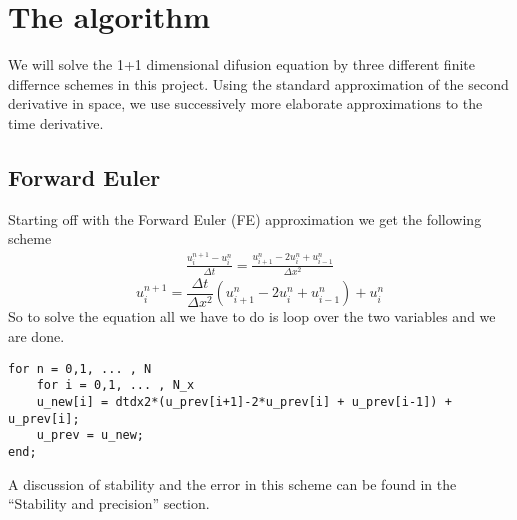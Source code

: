 \documentclass[a4paper,english, 10pt, twoside]{article}
\begin{document}
\section{The algorithm}\label{numerical}
We will solve the 1+1 dimensional difusion equation by three different finite differnce schemes in this project. Using the 
standard approximation of the second derivative in space, we use successively more elaborate approximations to the time derivative. 
\subsection{Forward Euler}
Starting off with the Forward Euler (FE) approximation we get the following scheme
\begin{align*}
 \frac{u^{n+1}_i-u^n_i}{\Delta t} = \frac{u^n_{i+1}-2u^n_i + u^n_{i-1}}{\Delta x^2}
\end{align*}
\begin{equation}\label{FE}
 u^{n+1}_i = \frac{\Delta t}{\Delta x^2}\left(u^n_{i+1}-2u^n_i + u^n_{i-1}\right) +u^n_i
\end{equation}
So to solve the equation all we have to do is loop over the two variables and we are done.\\
\begin{lstlisting}
for n = 0,1, ... , N
    for i = 0,1, ... , N_x
	u_new[i] = dtdx2*(u_prev[i+1]-2*u_prev[i] + u_prev[i-1]) + u_prev[i];
    u_prev = u_new;
end;
\end{lstlisting}

A discussion of stability and the error in this scheme can be found in the ``Stability and precision'' section.
\end{document}

